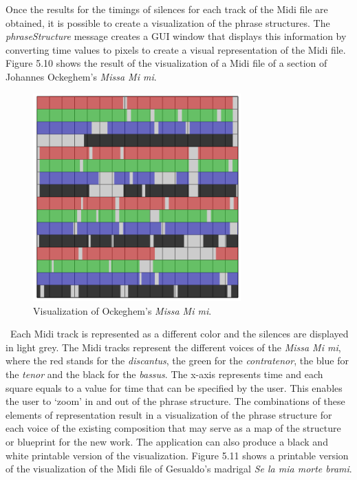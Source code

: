 Once the results for the timings of silences for each track of the Midi file are obtained, it is possible to create a visualization of the phrase structures. The \emph{phraseStructure} message creates a GUI window that displays this information by converting time values to pixels to create a visual representation of the Midi file. Figure 5.10 shows the result of the visualization of a Midi file of a section of Johannes Ockeghem's \emph{Missa Mi mi}. 
\begin{figure}[htbp] %
   \centering
   \includegraphics[width=8cm]{chapter5/midi_phrase.tif} %
   \caption{Visualization of Ockeghem's \emph{Missa Mi mi}.}
   \label{fig:example}
\end{figure}\
Each Midi track is represented as a different color and the silences are displayed in light grey. The Midi tracks represent the different voices of the \emph{Missa Mi mi}, where the red stands for the \emph{discantus}, the green for the \emph{contratenor}, the blue for the \emph{tenor} and the black for the \emph{bassus}. The x-axis represents time and each square equals to a value for time that can be specified by the user. This enables the user to `zoom' in and out of the phrase structure. The combinations of these elements of representation result in a visualization of the phrase structure for each voice of the existing composition that may serve as a map of the structure or blueprint for the new work. The application can also produce a black and white printable version of the visualization. Figure 5.11 shows a printable version of the visualization of the Midi file of Gesualdo's madrigal \emph{Se la mia morte brami}. 
